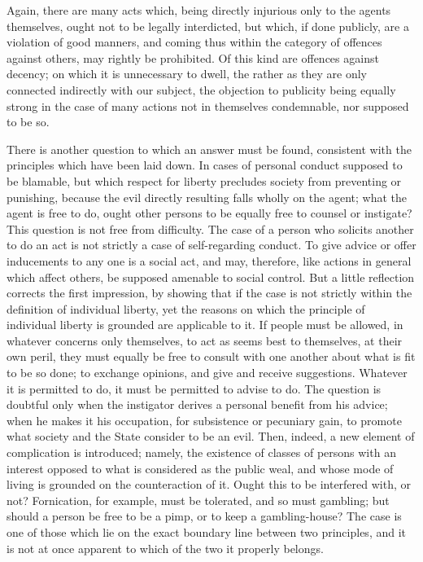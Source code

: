 \documentclass[11pt,openany]{book}
\begin{document}
Again, there are many acts which, being directly injurious only to the agents themselves, ought not to be legally interdicted, but which, if done publicly, are a violation of good manners, and coming thus within the category of offences against others, may rightly be prohibited. Of this kind are offences against decency; on which it is unnecessary to dwell, the rather as they are only connected indirectly with our subject, the objection to publicity being equally strong in the case of many actions not in themselves condemnable, nor supposed to be so.

There is another question to which an answer must be found, consistent with the principles which have been laid down. In cases of personal conduct supposed to be blamable, but which respect for liberty precludes society from preventing or punishing, because the evil directly resulting falls wholly on the agent; what the agent is free to do, ought other persons to be equally free to counsel or instigate? This question is not free from difficulty. The case of a person who solicits another to do an act is not strictly a case of self-regarding conduct. To give advice or offer inducements to any one is a social act, and may, therefore, like actions in general which affect others, be supposed amenable to social control. But a little reflection corrects the first impression, by showing that if the case is not strictly within the definition of individual liberty, yet the reasons on which the principle of individual liberty is grounded are applicable to it. If people must be allowed, in whatever concerns only themselves, to act as seems best to themselves, at their own peril, they must equally be free to consult with one another about what is fit to be so done; to exchange opinions, and give and receive suggestions. Whatever it is permitted to do, it must be permitted to advise to do. The question is doubtful only when the instigator derives a personal benefit from his advice; when he makes it his occupation, for subsistence or pecuniary gain, to promote what society and the State consider to be an evil. Then, indeed, a new element of complication is introduced; namely, the existence of classes of persons with an interest opposed to what is considered as the public weal, and whose mode of living is grounded on the counteraction of it. Ought this to be interfered with, or not? Fornication, for example, must be tolerated, and so must gambling; but should a person be free to be a pimp, or to keep a gambling-house? The case is one of those which lie on the exact boundary line between two principles, and it is not at once apparent to which of the two it properly belongs.
\end{document}
